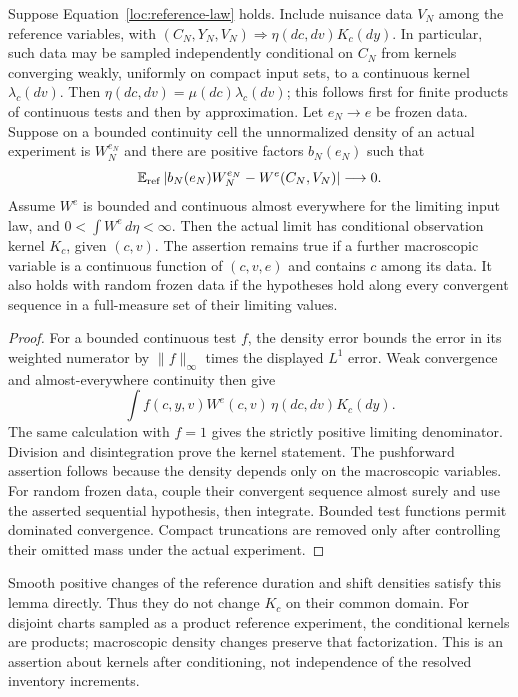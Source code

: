 \begin{lemma}\label{loc:weighted-transfer}
Suppose Equation~\eqref{loc:reference-law} holds.  Include nuisance data
$V_N$ among the reference variables, with
$(C_N,Y_N,V_N)\Longrightarrow\eta(dc,dv)K_c(dy)$.  In particular, such
data may be sampled independently conditional on $C_N$ from kernels
converging weakly, uniformly on compact input sets, to a continuous
kernel $\lambda_c(dv)$.  Then
$\eta(dc,dv)=\mu(dc)\lambda_c(dv)$; this follows first for finite
products of continuous tests and then by approximation.  Let $e_N\to e$
be frozen data.
Suppose on a bounded continuity cell the unnormalized density of an
actual experiment is $W_N^{e_N}$ and there are positive factors
$b_N(e_N)$ such that
\[
 \mathbb E_{\rm ref}
 \left|b_N(e_N)W_N^{e_N}-W^e(C_N,V_N)\right|\longrightarrow0.
\]
Assume $W^e$ is bounded and continuous almost everywhere for the limiting
input law, and $0<\int W^e\,d\eta<\infty$.
Then the actual limit has conditional observation kernel $K_c$, given
$(c,v)$.  The assertion remains true if a further macroscopic variable is
a continuous function of $(c,v,e)$ and contains $c$ among its data.
It also holds with random frozen data if the hypotheses hold along every
convergent sequence in a full-measure set of their limiting values.
\end{lemma}
\begin{proof}
For a bounded continuous test $f$, the density error bounds the error in
its weighted numerator by $\|f\|_\infty$ times the displayed
$L^1$ error.  Weak convergence and almost-everywhere continuity then give
\[
 \int f(c,y,v)W^e(c,v)\,\eta(dc,dv)K_c(dy).
\]
The same calculation with $f=1$ gives the strictly positive limiting
denominator.  Division and disintegration prove the kernel statement.
The pushforward assertion follows because the density depends only on
the macroscopic variables.  For random frozen data, couple their
convergent sequence almost surely and use the asserted sequential
hypothesis, then integrate.  Bounded test functions permit dominated
convergence.  Compact truncations are removed only after controlling
their omitted mass under the actual experiment.
\end{proof}

Smooth positive changes of the reference duration and shift densities
satisfy this lemma directly.  Thus they do not change $K_c$ on their
common domain.  For disjoint charts sampled as a product reference
experiment, the conditional kernels are products; macroscopic density
changes preserve that factorization.  This is an assertion about kernels
after conditioning, not independence of the resolved inventory
increments.

